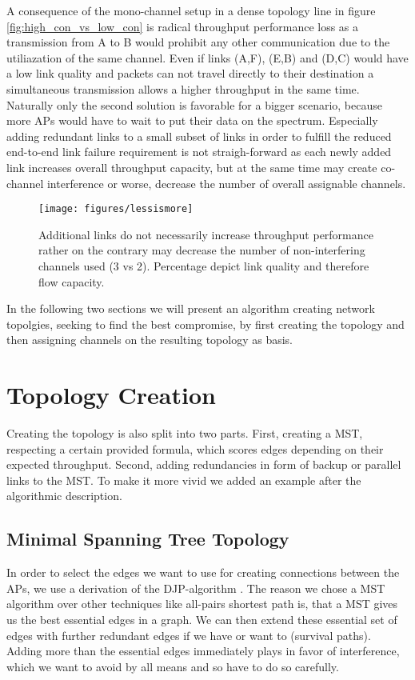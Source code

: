   A consequence of the mono-channel setup in a dense topology line in figure \ref{fig:high_con_vs_low_con} is radical throughput performance loss as a transmission from
  A to B would prohibit any other communication due to the utiliazation of the same channel. Even if links (A,F), (E,B) and (D,C) would have a low link quality and packets
  can not travel directly to their destination a simultaneous transmission allows a higher throughput in the same time. Naturally only the second solution is favorable for a
  bigger scenario, because more APs would have to wait to put their data on the spectrum.
  Especially adding redundant links to a small subset of links in order to fulfill the reduced end-to-end link failure requirement is not straigh-forward as each newly
  added link increases overall throughput capacity, but at the same time may create co-channel interference or worse, decrease the number of overall assignable channels.
  
  \begin{figure}[h!]
    \centering
      \texttt{[image: figures/lessismore]}
      \caption{Additional links do not necessarily increase throughput performance rather on the contrary may decrease the number of non-interfering channels used (3 vs 2).
	Percentage depict link quality and therefore flow capacity.}
    \label{fig:lessismore}
  \end{figure}
  
  In the following two sections we will present an algorithm creating network topolgies, seeking to find the best compromise, by first creating the topology and then
  assigning channels on the resulting topology as basis.
 
  \section{Topology Creation}
    Creating the topology is also split into two parts.
    First, creating a \ac{MST}, respecting a certain provided formula, which scores edges depending on their expected throughput.
    Second, adding redundancies in form of backup or parallel links to the \ac{MST}. 
    To make it more vivid we added an example after the algorithmic description.

    \subsection{Minimal Spanning Tree Topology}
      In order to select the edges we want to use for creating connections between the APs, we use a derivation of the \ac{DJP}-algorithm \cite{prim}\cite{jarnik}.
      The reason we chose a \ac{MST} algorithm over other techniques like all-pairs shortest path is, that a \ac{MST} gives us the best essential edges in a graph. 
      We can then extend these essential set of edges with further redundant edges if we have or want to (survival paths). 
      Adding more than the essential edges immediately plays in favor of interference, which we want to avoid by all means and so have to do so carefully.
      

